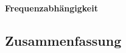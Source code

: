 \documentclass[12pt,english,ngerman]{scrartcl}
\begin{document}
\paragraph{Frequenzabhängigkeit}




\subsection{Zusammenfassung}

\newpage

\printbibliography

\listoffigures

\listoftables
\end{document}
